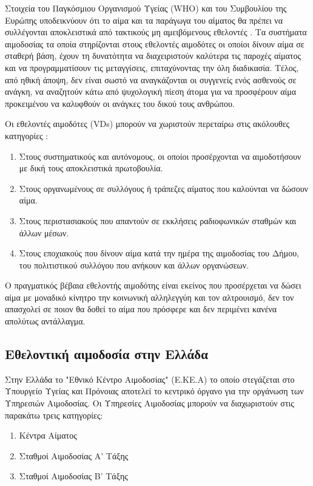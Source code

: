		Στοιχεία του Παγκόσμιου Οργανισμού Υγείας (WHO) και του Συμβουλίου της Ευρώπης υποδεικνύουν ότι το αίμα και τα παράγωγα του αίματος θα πρέπει να συλλέγονται αποκλειστικά από τακτικούς μη αμειβόμενους εθελοντές \cite{VOX:VOX5295}. Τα συστήματα αιμοδοσίας τα οποία στηρίζονται στους εθελοντές αιμοδότες οι οποίοι δίνουν αίμα σε σταθερή βάση, έχουν τη δυνατότητα να διαχειριστούν καλύτερα τις παροχές αίματος και να προγραμματίσουν τις μεταγγίσεις, επιταχύνοντας την όλη διαδικασία. Τέλος, από ηθική άποψη, δεν είναι σωστό να αναγκάζονται οι συγγενείς ενός ασθενούς σε ανάγκη, να αναζητούν κάτω από ψυχολογική πίεση άτομα για να προσφέρουν αίμα προκειμένου να καλυφθούν οι ανάγκες του δικού τους ανθρώπου.

		Οι εθελοντές αιμοδότες (VDs) μπορούν να χωριστούν περεταίρω στις ακόλουθες κατηγορίες \cite{karabaggeli-blatsa}:
		\begin{enumerate}
			\item Στους συστηματικούς και αυτόνομους, οι οποίοι προσέρχονται να αιμοδοτήσουν με δική τους αποκλειστικά πρωτοβουλία.
			\item Στους οργανωμένους σε συλλόγους ή τράπεζες αίματος που καλούνται να δώσουν αίμα.
			\item Στους περιστασιακούς που απαντούν σε εκκλήσεις ραδιοφωνικών σταθμών και άλλων μέσων.
			\item Στους εποχιακούς που δίνουν αίμα κατά την ημέρα της αιμοδοσίας του Δήμου, του πολιτιστικού συλλόγου που ανήκουν και άλλων οργανώσεων.
		\end{enumerate}
		
		Ο πραγματικός βέβαια εθελοντής αιμοδότης είναι εκείνος που προσέρχεται να δώσει αίμα με μοναδικό κίνητρο την κοινωνική αλληλεγγύη και τον αλτρουισμό, δεν τον απασχολεί σε ποιον θα δοθεί το αίμα που πρόσφερε και δεν περιμένει κανένα απολύτως αντάλλαγμα.
				
	\subsection{Εθελοντική αιμοδοσία στην Ελλάδα}
		Στην Ελλάδα το "Εθνικό Κέντρο Αιμοδοσίας" (Ε.ΚΕ.Α) το οποίο στεγάζεται στο Υπουργείο Υγείας και Πρόνοιας αποτελεί το κεντρικό όργανο για την οργάνωση των Υπηρεσιών Αιμοδοσίας. Οι Υπηρεσίες Αιμοδοσίας μπορούν να διαχωριστούν στις παρακάτω τρεις κατηγορίες:
		\begin{enumerate}
			\item Κέντρα Αίματος
			\item Σταθμοί Αιμοδοσίας Α' Τάξης
			\item Σταθμοί Αιμοδοσίας Β' Τάξης
		\end{enumerate}
				 
